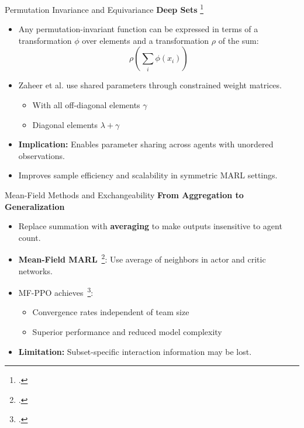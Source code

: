 \begin{frame}{Permutation Invariance and Equivariance}
    \textbf{Deep Sets} \footcite{zaheer2017}
    \begin{itemize}
        \item Any permutation-invariant function can be expressed in terms of 
            a transformation \(\phi\) over elements and a transformation \(\rho\) of the sum: 
            \[\rho\left(\sum_i \phi(x_i)\right)\]
        \item Zaheer et al. use shared parameters through constrained weight matrices.
        \begin{itemize}
            \item With all off-diagonal elements \(\gamma\)
            \item Diagonal elements \(\lambda+\gamma\)
        \end{itemize}
        \item \textbf{Implication:} Enables parameter sharing across agents with unordered observations.
        \item Improves sample efficiency and scalability in symmetric MARL settings.
    \end{itemize}
\end{frame}

\begin{frame}{Mean-Field Methods and Exchangeability}
    \textbf{From Aggregation to Generalization}
    \begin{itemize}
        \item Replace summation with \textbf{averaging} to make outputs insensitive to agent count.
        \item \textbf{Mean-Field MARL}~\footcite{yang2018}: 
            Use average of neighbors in actor and critic networks.
        \item MF-PPO achieves~\footcite{li2021b}:
        \begin{itemize}
            \item Convergence rates independent of team size
            \item Superior performance and reduced model complexity
        \end{itemize}
        \item \textbf{Limitation:} Subset-specific interaction information may be lost.
    \end{itemize}
\end{frame}

